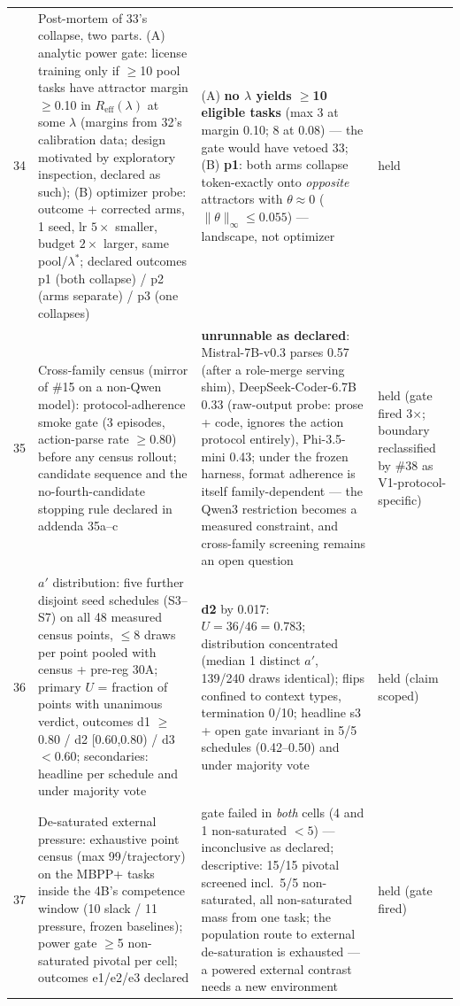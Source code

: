 \documentclass{article}
\theoremstyle{remark}
\begin{document}
\begin{table}[h]
{\begin{tabular}{clll}
34 & Post-mortem of 33's collapse, two parts. (A) analytic power gate: license training only if $\geq$10 pool tasks have attractor margin $\geq$0.10 in $R_{\text{eff}}(\lambda)$ at some $\lambda$ (margins from 32's calibration data; design motivated by exploratory inspection, declared as such); (B) optimizer probe: outcome + corrected arms, 1 seed, lr $5\times$ smaller, budget $2\times$ larger, same pool/$\lambda^{*}$; declared outcomes p1 (both collapse) / p2 (arms separate) / p3 (one collapses) & (A) \textbf{no $\lambda$ yields $\geq$10 eligible tasks} (max 3 at margin 0.10; 8 at 0.08) --- the gate would have vetoed 33; (B) \textbf{p1}: both arms collapse token-exactly onto \emph{opposite} attractors with $\theta\approx 0$ ($\|\theta\|_\infty\leq 0.055$) --- landscape, not optimizer & held \\
35 & Cross-family census (mirror of \#15 on a non-Qwen model): protocol-adherence smoke gate (3 episodes, action-parse rate $\geq$0.80) before any census rollout; candidate sequence and the no-fourth-candidate stopping rule declared in addenda 35a--c & \textbf{unrunnable as declared}: Mistral-7B-v0.3 parses 0.57 (after a role-merge serving shim), DeepSeek-Coder-6.7B 0.33 (raw-output probe: prose + code, ignores the action protocol entirely), Phi-3.5-mini 0.43; under the frozen harness, format adherence is itself family-dependent --- the Qwen3 restriction becomes a measured constraint, and cross-family screening remains an open question & held (gate fired 3$\times$; boundary reclassified by \#38 as V1-protocol-specific) \\
36 & $a'$ distribution: five further disjoint seed schedules (S3--S7) on all 48 measured census points, $\leq$8 draws per point pooled with census + pre-reg 30A; primary $U$ = fraction of points with unanimous verdict, outcomes d1 $\geq$0.80 / d2 [0.60,0.80) / d3 $<$0.60; secondaries: headline per schedule and under majority vote & \textbf{d2} by 0.017: $U = 36/46 = 0.783$; distribution concentrated (median 1 distinct $a'$, 139/240 draws identical); flips confined to context types, termination 0/10; headline s3 + open gate invariant in 5/5 schedules (0.42--0.50) and under majority vote & held (claim scoped) \\
37 & De-saturated external pressure: exhaustive point census (max 99/trajectory) on the MBPP+ tasks inside the 4B's competence window (10 slack / 11 pressure, frozen baselines); power gate $\geq$5 non-saturated pivotal per cell; outcomes e1/e2/e3 declared & gate failed in \emph{both} cells (4 and 1 non-saturated $<5$) --- inconclusive as declared; descriptive: 15/15 pivotal screened incl.\ 5/5 non-saturated, all non-saturated mass from one task; the population route to external de-saturation is exhausted --- a powered external contrast needs a new environment & held (gate fired) \\

\end{tabular}}
\end{table}
\end{document}
